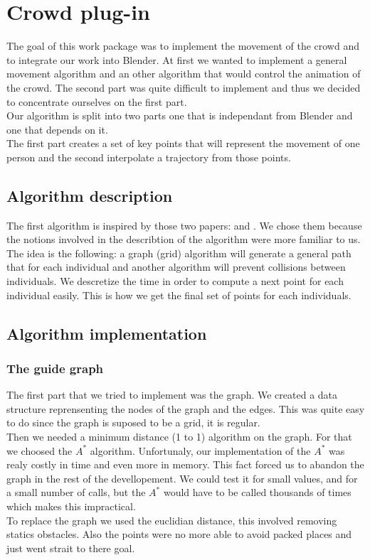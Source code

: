 \section{Crowd plug-in}

The goal of this work package was to implement the movement of the crowd and to integrate our work into Blender. At first we wanted to implement a general movement algorithm and an other algorithm that would control the animation of the crowd. The second part was quite difficult to implement and thus we decided to concentrate ourselves on the first part.\\
Our algorithm is split into two parts one that is independant from Blender and one that depends on it. \\
The first part creates a set of key points that will represent the movement of one person and the second interpolate a trajectory from those points.

\subsection{Algorithm description}

The first algorithm is inspired by those two papers: \cite{PLE} and \cite{vandenBerg2011}. We chose them because the notions involved in the describtion of the algorithm were more familiar to us.
The idea is the following: a graph (grid) algorithm will generate a general path that for each individual and another algorithm will prevent collisions between individuals. We descretize the time in order to compute a next point for each individual easily. This is how we get the final set of points for each individuals.

\subsection{Algorithm implementation}

\subsubsection{The guide graph}

The first part that we tried to implement was the graph. We created a data structure reprensenting the nodes of the graph and the edges. This was quite easy to do since the graph is suposed to be a grid, it is regular.\\
Then we needed a minimum distance (1 to 1) algorithm on the graph. For that we choosed the $A^*$ algorithm. Unfortunaly, our implementation of the $A^*$ was realy costly in time and even more in memory. This fact forced us to abandon the graph in the rest of the devellopement. We could test it for small values, and for a small number of calls, but the $A^*$ would have to be called thousands of times which makes this impractical.\\ 
To replace the graph we used the euclidian distance, this involved removing statics obstacles. Also the points were no more able to avoid packed places and just went strait to there goal.

